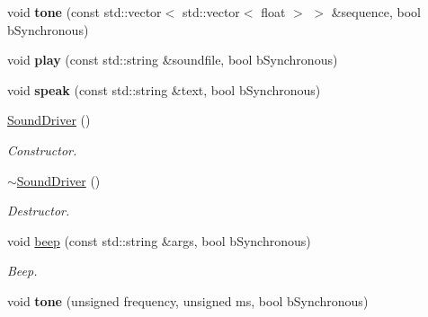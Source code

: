 \begin{DoxyCompactItemize}
\item 
\mbox{\label{classSoundDriver_a39ea1b35ab6091e79663fa489cdcff25}} 
void {\bfseries tone} (const std\+::vector$<$ std\+::vector$<$ float $>$ $>$ \&sequence, bool b\+Synchronous)
\item 
\mbox{\label{classSoundDriver_afd64ca3d517d01947d514eb689027eea}} 
void {\bfseries play} (const std\+::string \&soundfile, bool b\+Synchronous)
\item 
\mbox{\label{classSoundDriver_a44869623a4c7ad03e9a65388647bc10c}} 
void {\bfseries speak} (const std\+::string \&text, bool b\+Synchronous)
\item 
\mbox{\label{classSoundDriver_aa45970b1e9155eb51a155cc7ef4389dc}} 
\hyperlink{classSoundDriver_aa45970b1e9155eb51a155cc7ef4389dc}{Sound\+Driver} ()
\begin{DoxyCompactList}\small\item\em Constructor. \end{DoxyCompactList}\item 
\mbox{\label{classSoundDriver_a45845cb8587a626a4ab6a2c53dcdf7c0}} 
\hyperlink{classSoundDriver_a45845cb8587a626a4ab6a2c53dcdf7c0}{$\sim$\+Sound\+Driver} ()
\begin{DoxyCompactList}\small\item\em Destructor. \end{DoxyCompactList}\item 
\mbox{\label{classSoundDriver_a33bbfa860cd88f113d1fbf4bf68708ba}} 
void \hyperlink{classSoundDriver_a33bbfa860cd88f113d1fbf4bf68708ba}{beep} (const std\+::string \&args, bool b\+Synchronous)
\begin{DoxyCompactList}\small\item\em Beep. \end{DoxyCompactList}\item 
\mbox{\label{classSoundDriver_a73ac421559404c201308915ad9e4f8e0}} 
void {\bfseries tone} (unsigned frequency, unsigned ms, bool b\+Synchronous)
\item 
\mbox{\label{classSoundDriver_a39ea1b35ab6091e79663fa489cdcff25}} 

\end{DoxyCompactItemize}
